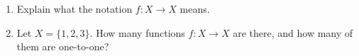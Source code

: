 \begin{enumerate}
\item[(a)] Explain what the notation $f:X\to X$ means.
\item[(b)] Let $X=\{1,2,3\}$. How many functions $f:X\to X$ are there, and how many of them are one-to-one?
\end{enumerate}
